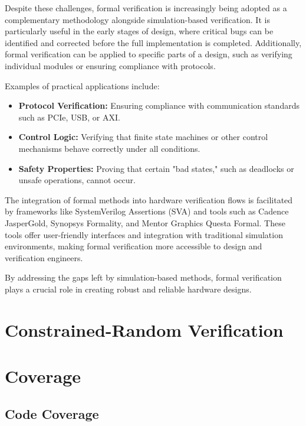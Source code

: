 \documentclass[12pt]{book}
\begin{document}
Despite these challenges, formal verification is increasingly being adopted as a complementary methodology alongside simulation-based verification. It is particularly useful in the early stages of design, where critical bugs can be identified and corrected before the full implementation is completed. Additionally, formal verification can be applied to specific parts of a design, such as verifying individual modules or ensuring compliance with protocols.

Examples of practical applications include:
\begin{itemize}
    \item \textbf{Protocol Verification:} Ensuring compliance with communication standards such as PCIe, USB, or AXI.
    \item \textbf{Control Logic:} Verifying that finite state machines or other control mechanisms behave correctly under all conditions.
    \item \textbf{Safety Properties:} Proving that certain "bad states," such as deadlocks or unsafe operations, cannot occur.
\end{itemize}

The integration of formal methods into hardware verification flows is facilitated by frameworks like SystemVerilog Assertions (SVA) and tools such as Cadence JasperGold, Synopsys Formality, and Mentor Graphics Questa Formal. These tools offer user-friendly interfaces and integration with traditional simulation environments, making formal verification more accessible to design and verification engineers.

By addressing the gaps left by simulation-based methods, formal verification plays a crucial role in creating robust and reliable hardware designs.


\section{Constrained-Random Verification} %

\cite{Mehta2021}

\section{Coverage} %

\subsection{Code Coverage}
\end{document}
